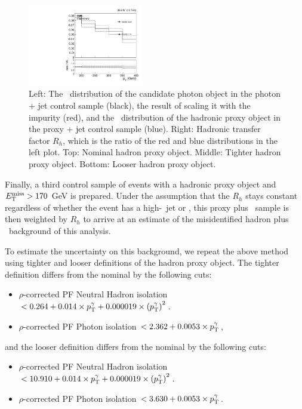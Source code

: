 \begin{figure}[htbp]
\begin{center}
    \includegraphics[width=0.45\textwidth]{Analysis/Figures/hfake/tfactorLoose.pdf}
    \caption{
      Left: The \pt\ distribution of the candidate photon object in the photon + jet control sample (black), the result of scaling it with the impurity (red), and the \pt\ distribution of the hadronic proxy object in the proxy + jet control sample (blue).
      Right: Hadronic transfer factor $R_{h}$, which is the ratio of the red and blue distributions in the left plot. 
      Top: Nominal hadron proxy object. 
      Middle: Tighter hadron proxy object. 
      Bottom: Looser hadron proxy object.
    }
    \label{fig:hadronTFactor}
  \end{center}
\end{figure}

Finally, a third control sample of events with a hadronic proxy object and $E_{\mathrm{T}}^{\text{miss}} > 170$ GeV is prepared. 
Under the assumption that the $R_{h}$ stays constant regardless of whether the event has a high-\pt\ jet or \met, this proxy plus \met\ sample is then weighted by $R_{h}$ to arrive at an estimate of the misidentified hadron plus \met\ background of this analysis.

To estimate the uncertainty on this background, we repeat the above method using tighter and looser definitions of the hadron proxy object.
The tighter definition differs from the nominal by the following cuts:
\begin{itemize}
\item $\rho$-corrected PF Neutral Hadron isolation $< 0.264 + 0.014 \times p_{\mathrm{T}}^\gamma + 0.000019 \times \left( p_{\mathrm{T}}^\gamma \right)^2$. 
\item $\rho$-corrected PF Photon isolation $< 2.362 + 0.0053 \times p_{\mathrm{T}}^\gamma$,
\end{itemize}
and the looser definition differs from the nominal by the following cuts:
\begin{itemize}
\item $\rho$-corrected PF Neutral Hadron isolation $< 10.910 + 0.014 \times p_{\mathrm{T}}^\gamma + 0.000019 \times \left( p_{\mathrm{T}}^\gamma \right)^2$. 
\item $\rho$-corrected PF Photon isolation $< 3.630 + 0.0053 \times p_{\mathrm{T}}^\gamma$.
\end{itemize}

